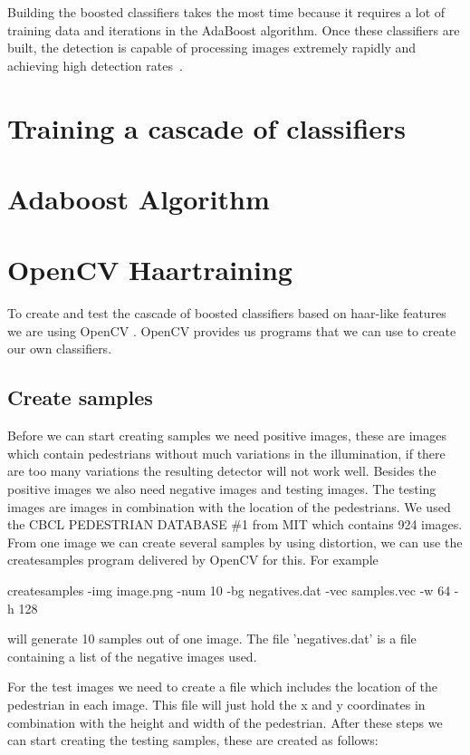 \documentclass{article}
\begin{document}
Building the boosted classifiers takes the most time because it requires a lot of training data and iterations in the AdaBoost algorithm. Once these classifiers are built, the detection is capable of processing images extremely rapidly and achieving high detection rates~\cite{viola2001rapid}.

\section{Training a cascade of classifiers}

\section{Adaboost Algorithm}


\section{OpenCV Haartraining}
To create and test the cascade of boosted classifiers based on haar-like features we are using OpenCV \cite{opencv_library}. OpenCV provides us programs that we can use to create our own classifiers.

\subsection{Create samples}
Before we can start creating samples we need positive images, these are images which contain pedestrians without much variations in the illumination, if there are too many variations the resulting detector will not work well.
Besides the positive images we also need negative images and testing images. The testing images are images in combination with the location of the pedestrians. We used the CBCL PEDESTRIAN DATABASE \#1 from MIT which contains 924 images.
From one image we can create several samples by using distortion, we can use the createsamples program delivered by OpenCV for this. For example 

createsamples -img image.png -num 10 -bg negatives.dat -vec samples.vec -w 64 -h 128

will generate 10 samples out of one image.
The file 'negatives.dat' is a file containing a list of the negative images used.

For the test images we need to create a file which includes the location of the pedestrian in each image. This file will just hold the x and y coordinates in combination with the height and width of the pedestrian.
After these steps we can start creating the testing samples, these are created as follows:
\end{document}
